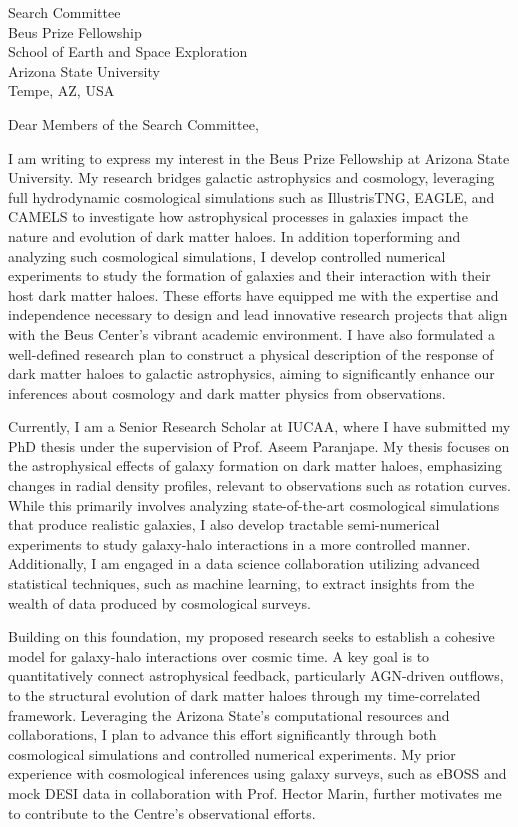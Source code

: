 \documentclass[11pt]{letter}
\begin{document}
\begin{letter}{Search Committee \\ Beus Prize Fellowship \\ School of Earth and Space Exploration \\ Arizona State University \\ Tempe, AZ, USA}

\opening{Dear Members of the Search Committee,}

I am writing to express my interest in the Beus Prize Fellowship at Arizona State University. My research bridges galactic astrophysics and cosmology, leveraging full hydrodynamic cosmological simulations such as IllustrisTNG, EAGLE, and CAMELS to investigate how astrophysical processes in galaxies impact the nature and evolution of dark matter haloes. In addition toperforming and analyzing such cosmological simulations, I develop controlled numerical experiments to study the formation of galaxies and their interaction with their host dark matter haloes. These efforts have equipped me with the expertise and independence necessary to design and lead innovative research projects that align with the Beus Center's vibrant academic environment. I have also formulated a well-defined research plan to construct a physical description of the response of dark matter haloes to galactic astrophysics, aiming to significantly enhance our inferences about cosmology and dark matter physics from observations.

Currently, I am a Senior Research Scholar at IUCAA, where I have submitted my PhD thesis under the supervision of Prof. Aseem Paranjape. My thesis focuses on the astrophysical effects of galaxy formation on dark matter haloes, emphasizing changes in radial density profiles, relevant to observations such as rotation curves. While this primarily involves analyzing state-of-the-art cosmological simulations that produce realistic galaxies, I also develop tractable semi-numerical experiments to study galaxy-halo interactions in a more controlled manner. Additionally, I am engaged in a data science collaboration utilizing advanced statistical techniques, such as machine learning, to extract insights from the wealth of data produced by cosmological surveys.

Building on this foundation, my proposed research seeks to establish a cohesive model for galaxy-halo interactions over cosmic time. A key goal is to quantitatively connect astrophysical feedback, particularly AGN-driven outflows, to the structural evolution of dark matter haloes through my time-correlated framework. Leveraging the Arizona State's computational resources and collaborations, I plan to advance this effort significantly through both cosmological simulations and controlled numerical experiments. My prior experience with cosmological inferences using galaxy surveys, such as eBOSS and mock DESI data in collaboration with Prof. Hector Marin, further motivates me to contribute to the Centre's observational efforts.


\end{letter}
\end{document}
